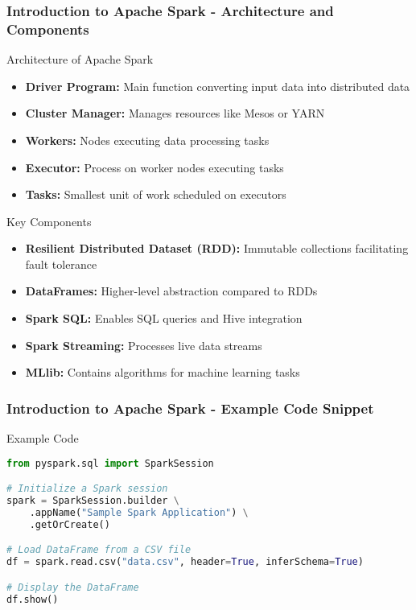 \documentclass[aspectratio=169]{beamer}
\begin{document}
\begin{frame}[fragile]
    \frametitle{Introduction to Apache Spark - Architecture and Components}
    \begin{block}{Architecture of Apache Spark}
        \begin{itemize}
            \item \textbf{Driver Program:} Main function converting input data into distributed data
            \item \textbf{Cluster Manager:} Manages resources like Mesos or YARN
            \item \textbf{Workers:} Nodes executing data processing tasks
            \item \textbf{Executor:} Process on worker nodes executing tasks
            \item \textbf{Tasks:} Smallest unit of work scheduled on executors
        \end{itemize}
    \end{block}
    
    \begin{block}{Key Components}
        \begin{itemize}
            \item \textbf{Resilient Distributed Dataset (RDD):} Immutable collections facilitating fault tolerance
            \item \textbf{DataFrames:} Higher-level abstraction compared to RDDs
            \item \textbf{Spark SQL:} Enables SQL queries and Hive integration
            \item \textbf{Spark Streaming:} Processes live data streams
            \item \textbf{MLlib:} Contains algorithms for machine learning tasks
        \end{itemize}
    \end{block}
\end{frame}

\begin{frame}[fragile]
    \frametitle{Introduction to Apache Spark - Example Code Snippet}
    \begin{block}{Example Code}
        \begin{lstlisting}[language=Python]
from pyspark.sql import SparkSession

# Initialize a Spark session
spark = SparkSession.builder \
    .appName("Sample Spark Application") \
    .getOrCreate()

# Load DataFrame from a CSV file
df = spark.read.csv("data.csv", header=True, inferSchema=True)

# Display the DataFrame
df.show()
        \end{lstlisting}
    \end{block}
\end{frame}
\end{document}
